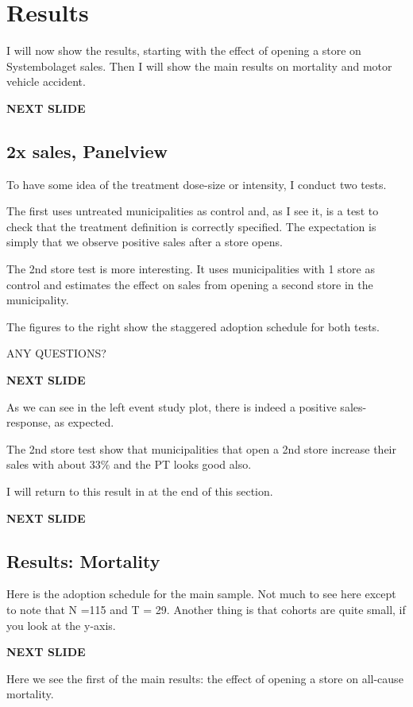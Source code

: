 \documentclass[12pt]{article}
\begin{document}
\section{Results}

I will now show the results, starting with the effect of opening a store on Systembolaget sales. Then I will show the main results on mortality and motor vehicle accident.

\textbf{NEXT SLIDE}

\subsection{2x sales, Panelview}
To have some idea of the treatment dose-size or intensity, I conduct two tests.

The first uses untreated municipalities as control and, as I see it, is a test to check that the treatment definition is correctly specified. The expectation is simply that we observe positive sales after a store opens.

The 2nd store test is more interesting. It uses municipalities with 1 store as control and estimates the effect on sales from opening a second store in the municipality.

The figures to the right show the staggered adoption schedule for both tests. 

ANY QUESTIONS?

\textbf{NEXT SLIDE}

As we can see in the left event study plot, there is indeed a positive sales-response, as expected.

The 2nd store test show that municipalities that open a 2nd store increase their sales with about 33\% and the PT looks good also.

I will return to this result in at the end of this section.

\textbf{NEXT SLIDE}

\subsection{Results: Mortality} 

Here is the adoption schedule for the main sample. Not much to see here except to note that N =115 and T = 29. Another thing is that cohorts are quite small, if you look at the y-axis.

\textbf{NEXT SLIDE}

Here we see the first of the main results: the effect of opening a store on all-cause mortality. 
\end{document}
